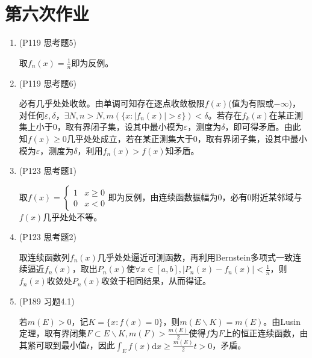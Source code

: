 \documentclass[a4paper,UTF8,fontset=windows]{ctexart}
\begin{document}
\section{第六次作业}
\begin{enumerate}
    \item (P119 思考题5)
    
    取$f_n(x)=\frac{1}{n}$即为反例。
    
    \item (P119 思考题6)
    
    必有几乎处处收敛。由单调可知存在逐点收敛极限$f(x)$(值为有限或$-\infty$)，对任何$\varepsilon,\delta$，$\exists N,n>N,m(\{x:|f_n(x)|>\varepsilon\})<\delta$。若存在$f_k(x)$在某正测集上小于0，取有界闭子集，设其中最小模为$\varepsilon$，测度为$\delta$，即可得矛盾。由此知$f(x)\ge0$几乎处处成立，若在某正测集大于0，取有界闭子集，设其中最小模为$\varepsilon$，测度为$\delta$，利用$f_n(x)>f(x)$知矛盾。
    
    \item (P123 思考题1)
    
    取$f(x)=\begin{cases}1&x\ge0\\0&x<0\end{cases}$即为反例，由连续函数振幅为0，必有0附近某邻域与$f(x)$几乎处处不等。
    
    \item (P123 思考题2)
    
    取连续函数列$f_n(x)$几乎处处逼近可测函数，再利用Bernstein多项式一致连续逼近$f_n(x)$，取出$P_n(x)$使$\forall x\in[a,b],|P_n(x)-f_n(x)|<\frac{1}{n}$，则$f_n(x)$收敛处$P_n(x)$收敛于相同结果，从而得证。
    
    \item (P189 习题4.1)
    
    若$m(E)>0$，记$K=\{x:f(x)=0\}$，则$m(E\backslash K)=m(E)$。由Lusin定理，取有界闭集$F\subset E\backslash K,m(F)>\frac{m(E)}{2}$使得$f$为$F$上的恒正连续函数，由其紧可取到最小值$t$，因此$\int_Ef(x)\mathrm{d}x\ge\frac{m(E)}{2}t>0$，矛盾。
\end{enumerate}
\end{document}
